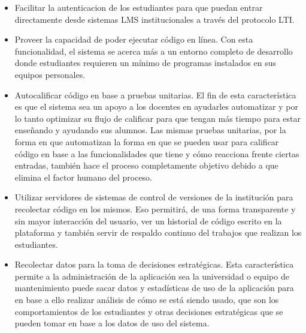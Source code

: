 \begin{itemize}
	\item Facilitar la autenticacion de los estudiantes para que puedan entrar directamente desde sistemas LMS  institucionales a través del protocolo LTI. 
	\item {} Proveer la capacidad de poder ejecutar código en línea. Con esta funcionalidad, el sistema se acerca más a un entorno completo de desarrollo donde estudiantes requieren un mínimo de programas instalados en sus equipos personales. 
	\item {} Autocalificar código en base a pruebas unitarias. El fin de esta característica es que el sistema sea un apoyo a los docentes en ayudarles automatizar y por lo tanto optimizar su flujo de calificar para que tengan más tiempo para estar enseñando y ayudando sus alumnos. Las mismas pruebas unitarias, por la forma en que automatizan la forma en que se pueden usar para calificar código en base a las funcionalidades que tiene y cómo reacciona frente ciertas entradas, también hace el proceso completamente objetivo debido a que elimina el factor humano del proceso. 
	\item {} Utilizar servidores de sistemas de control de versiones de la institución para recolectar código en los mismos. Eso permitirá, de una forma transparente y sin mayor interacción del usuario, ver un historial de código escrito en la plataforma y también servir de respaldo continuo del trabajos que realizan los estudiantes.  
	\item {}  Recolectar datos para la toma de decisiones estratégicas. Esta característica permite a la administración de la aplicación sea la universidad o equipo de mantenimiento puede sacar datos y estadísticas de uso de la aplicación para en base a ello realizar análisis de cómo se está siendo usado, que son los comportamientos de los estudiantes y otras decisiones estratégicas que se pueden tomar en base a los datos de uso del sistema.  
\end{itemize}

